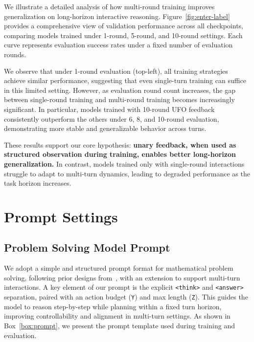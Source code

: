 We illustrate a detailed analysis of how multi-round training improves generalization on long-horizon interactive reasoning. Figure~\ref{fig:enter-label} provides a comprehensive view of validation performance across all checkpoints, comparing models trained under 1-round, 5-round, and 10-round settings. Each curve represents evaluation success rates under a fixed number of evaluation rounds.

We observe that under 1-round evaluation (top-left), all training strategies achieve similar performance, suggesting that even single-turn training can suffice in this limited setting. However, as evaluation round count increases, the gap between single-round training and multi-round training becomes increasingly significant. In particular, models trained with 10-round UFO feedback consistently outperform the others under 6, 8, and 10-round evaluation, demonstrating more stable and generalizable behavior across turns.

These results support our core hypothesis: \textbf{unary feedback, when used as structured observation during training, enables better long-horizon generalization.} In contrast, models trained only with single-round interactions struggle to adapt to multi-turn dynamics, leading to degraded performance as the task horizon increases.

\section{Prompt Settings}
\subsection{Problem Solving Model Prompt}
We adopt a simple and structured prompt format for mathematical problem solving, following prior designs from~\citet{deepseekmath, qwen25}, with an extension to support multi-turn interactions. 
A key element of our prompt is the explicit \texttt{<think>} and \texttt{<answer>} separation, paired with an action budget (\texttt{Y}) and max length (\texttt{Z}). This guides the model to reason step-by-step while planning within a fixed turn horizon, improving controllability and alignment in multi-turn settings.
As shown in Box~\ref{box:prompt}, we present the prompt template used during training and evaluation.

